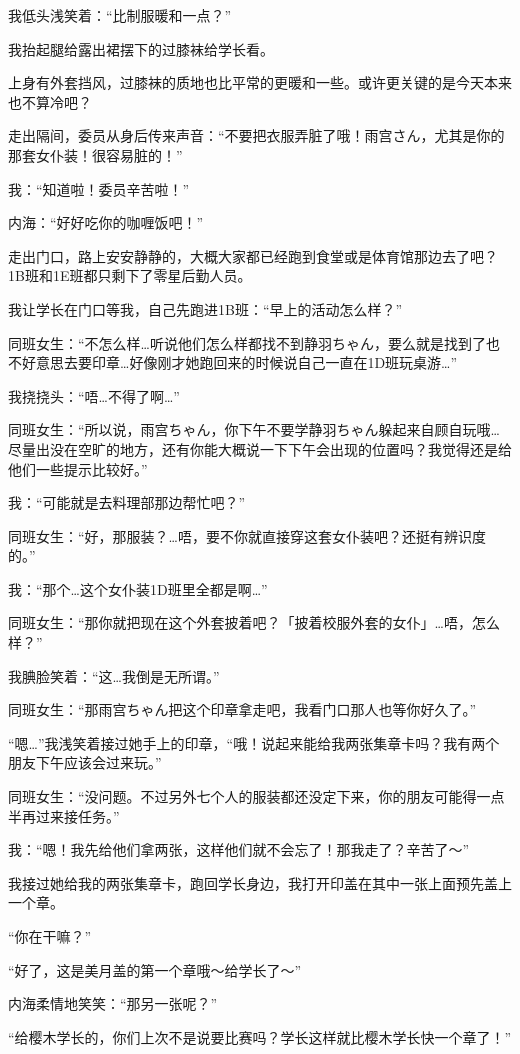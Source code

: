我低头浅笑着：“比制服暖和一点？”

我抬起腿给露出裙摆下的过膝袜给学长看。

上身有外套挡风，过膝袜的质地也比平常的更暖和一些。或许更关键的是今天本来也不算冷吧？

走出隔间，委员从身后传来声音：“不要把衣服弄脏了哦！雨宫さん，尤其是你的那套女仆装！很容易脏的！”

我：“知道啦！委员辛苦啦！”

内海：“好好吃你的咖喱饭吧！”


走出门口，路上安安静静的，大概大家都已经跑到食堂或是体育馆那边去了吧？1B班和1E班都只剩下了零星后勤人员。

我让学长在门口等我，自己先跑进1B班：“早上的活动怎么样？”

同班女生：“不怎么样…听说他们怎么样都找不到静羽ちゃん，要么就是找到了也不好意思去要印章…好像刚才她跑回来的时候说自己一直在1D班玩桌游…”

我挠挠头：“唔…不得了啊…”

同班女生：“所以说，雨宫ちゃん，你下午不要学静羽ちゃん躲起来自顾自玩哦…尽量出没在空旷的地方，还有你能大概说一下下午会出现的位置吗？我觉得还是给他们一些提示比较好。”

我：“可能就是去料理部那边帮忙吧？”

同班女生：“好，那服装？…唔，要不你就直接穿这套女仆装吧？还挺有辨识度的。”

我：“那个…这个女仆装1D班里全都是啊…”

同班女生：“那你就把现在这个外套披着吧？「披着校服外套的女仆」…唔，怎么样？”

我腆脸笑着：“这…我倒是无所谓。”

同班女生：“那雨宫ちゃん把这个印章拿走吧，我看门口那人也等你好久了。”

“嗯…”我浅笑着接过她手上的印章，“哦！说起来能给我两张集章卡吗？我有两个朋友下午应该会过来玩。”

同班女生：“没问题。不过另外七个人的服装都还没定下来，你的朋友可能得一点半再过来接任务。”

我：“嗯！我先给他们拿两张，这样他们就不会忘了！那我走了？辛苦了～”

我接过她给我的两张集章卡，跑回学长身边，我打开印盖在其中一张上面预先盖上一个章。

“你在干嘛？”

“好了，这是美月盖的第一个章哦～给学长了～”

内海柔情地笑笑：“那另一张呢？”

“给樱木学长的，你们上次不是说要比赛吗？学长这样就比樱木学长快一个章了！”

